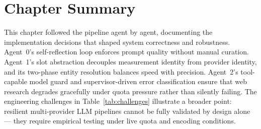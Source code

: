 \section{Chapter Summary}

This chapter followed the pipeline agent by agent, documenting the implementation
decisions that shaped system correctness and robustness.
Agent~0's self-reflection loop enforces prompt quality without manual curation.
Agent~1's slot abstraction decouples measurement identity from provider identity,
and its two-phase entity resolution balances speed with precision.
Agent~2's tool-capable model guard and supervisor-driven error classification
ensure that web research degrades gracefully under quota pressure rather than
silently failing.
The engineering challenges in Table~\ref{tab:challenges} illustrate a broader
point: resilient multi-provider LLM pipelines cannot be fully validated by design
alone — they require empirical testing under live quota and encoding conditions.

